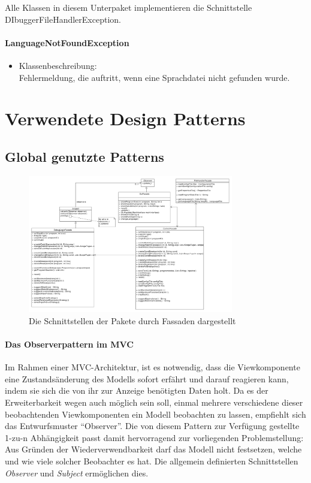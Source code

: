 \documentclass[parskip=full]{scrartcl}
\begin{document}
Alle Klassen in diesem Unterpaket implementieren die Schnittstelle DIbuggerFileHandlerException.
\paragraph{LanguageNotFoundException}
\begin{itemize}
\item Klassenbeschreibung: \\
Fehlermeldung, die auftritt, wenn eine Sprachdatei nicht gefunden wurde.
\end{itemize}


\section{Verwendete Design Patterns}\label{Patterns}
\subsection{Global genutzte Patterns}
\begin{figure}[!h]
\centering
\includegraphics[width=0.8\textwidth]{diagrammIdeenUmlet/fassaden.pdf}
\caption{Die Schnittstellen der Pakete durch Fassaden dargestellt}
\label{Terme}
\end{figure}
\paragraph{Das Observerpattern im MVC}
Im Rahmen einer MVC-Architektur, ist es notwendig, dass die Viewkomponente eine Zustandsänderung des Modells sofort erfährt und darauf reagieren kann, indem sie sich die von ihr zur Anzeige benötigten Daten holt. Da es der Erweiterbarkeit wegen auch möglich sein soll, einmal mehrere verschiedene dieser beobachtenden Viewkomponenten ein Modell beobachten zu lassen, empfiehlt sich das Entwurfsmuster \enquote{Observer}. Die von diesem Pattern zur Verfügung gestellte 1-zu-n Abhängigkeit passt damit hervorragend zur vorliegenden Problemstellung: Aus Gründen der Wiederverwendbarkeit darf das Modell nicht festsetzen, welche und wie viele solcher Beobachter es hat. Die allgemein definierten Schnittstellen \textit{Observer} und \textit{Subject} ermöglichen dies. 
\end{document}
